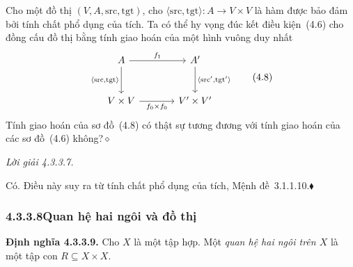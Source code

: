 Cho một đồ thị $(V,A,\mathrm{src},\mathrm{tgt})$, cho $\langle\mathrm{src},\mathrm{tgt}\rangle:A\to V\times V$ là hàm được bảo đảm bởi tính chất phổ dụng của tích. Ta có thể hy vọng đúc kết điều kiện~(4.6) cho đồng cấu đồ thị bằng tính giao hoán của một hình vuông duy nhất
\begin{equation}
\begin{tikzcd}[column sep=large,row sep=large]
A\arrow[r,"f_1"]\arrow[d,"{\langle\mathrm{src},\mathrm{tgt}\rangle}"']&A'\arrow[d,"{\langle\mathrm{src}',\mathrm{tgt}'\rangle}"]\\
V\times V\arrow[r,"f_0\times f_0"']&V'\times V'
\end{tikzcd}
\tag{4.8}
\end{equation}
Tính giao hoán của sơ đồ~(4.8) có thật sự tương đương với tính giao hoán của các sơ đồ~(4.6) không?\hfill$\diamond$

\noindent\textit{Lời giải 4.3.3.7.}\keepwithnext

Có. Điều này suy ra từ tính chất phổ dụng của tích, Mệnh đề~3.1.1.10.\hfill$\blacklozenge$

\subsubsection*{4.3.3.8\quad Quan hệ hai ngôi và đồ thị}

\noindent\textbf{Định nghĩa 4.3.3.9.} Cho $X$ là một tập hợp. Một \emph{quan hệ hai ngôi trên $X$} là một tập con $R\subseteq X\times X$.

